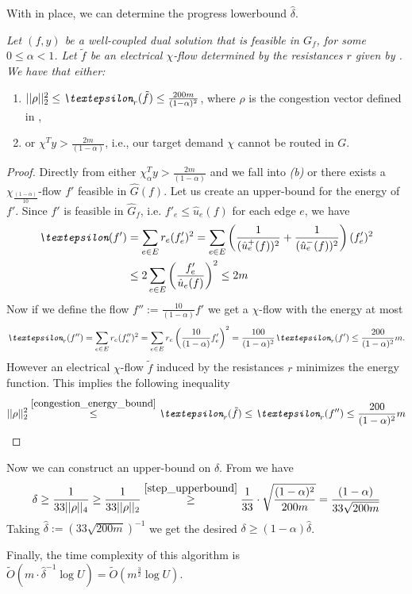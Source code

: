 With  in place, we can determine the progress lowerbound $\hat{\delta}$.
\begin{lemma}
\textit{Let $(f,y)$ be a well-coupled dual solution that is feasible in $G_f$, for some $0\le\alpha<1$. Let $\tilde  f$ be an electrical $\chi$-flow determined by the resistances $r$ given by  . We have that either:}
\begin{enumerate}[label=(\alph*)]
    \item $||\rho||_2^2\le\emph{\textepsilon}_r(\tilde  f)\le\frac{200m}{(1-\alpha)^2}$, where $\rho$ is the congestion vector defined in ,
    \item or $\chi^Ty>\frac{2m}{(1-\alpha)}$, i.e., our target demand $\chi$ cannot be routed in $G$.
\end{enumerate}
\end{lemma}
\begin{proof}
Directly from  either $\chi_\alpha^Ty>\frac{2m}{(1-\alpha)}$ and we fall into \textit{(b)} or there exists a $\chi_\frac{(1-\alpha)}{10}$-flow $f'$ feasible in $\hat G(f)$.
Let us create an upper-bound for the energy of $f'$. Since $f'$ is feasible in $\hat G_f$, i.e. $f'_e\le\hat u_e(f)$ for each edge $e$, we have
\begin{equation} 
\begin{split}
\emph{\textepsilon}(f')
&= \sum_{e\in E} r_e(f'_e)^2
= \sum_{e\in E}\left(\frac{1}{(\hat u_e^+(f))^2}+\frac{1}{(\hat u_e^-(f))^2}\right)(f'_e)^2\\
&\le 2\sum_{e\in E}\left(\frac{f'_e}{\hat u_e(f)}\right)^2
\le 2m
\end{split}
\end{equation}
Now if we define the flow $f'' := \frac{10}{(1-\alpha)}f'$ we get a $\chi$-flow with the energy at most
\[
\emph{\textepsilon}_r(f'')
= \sum_{e\in E} r_e(f''_e)^2
= \sum_{e\in E} r_e\left( \frac{10}{(1-\alpha)}f'_e\right)^2
= \frac{100}{(1-\alpha)^2} \emph{\textepsilon}_r(f')
\le \frac{200}{(1-\alpha)^2}m.
\]
However an electrical $\chi$-flow $\tilde f$ induced by the resistances $r$ minimizes the energy function. This implies the following inequality
\[
||\rho||_2^2
\stackrel{\ref{congestion_energy_bound}}{\le} \emph{\textepsilon}_r(\tilde f)
\le \emph{\textepsilon}_r(f'')
\le \frac{200}{(1-\alpha)^2}m
\]
\end{proof}

Now we can construct an upper-bound on $\delta$. From  we have
\[
\delta
\ge \frac{1}{33||\rho||_4}
\ge \frac{1}{33||\rho||_2}
\stackrel{\ref{step_upperbound}}{\ge} \frac{1}{33}\cdot\sqrt{\frac{(1-\alpha)^2}{200 m}}
= \frac{(1-\alpha)}{33\sqrt{200 m}}
\]
Taking $\hat{\delta} := (33\sqrt{200 m})^{-1}$ we get the desired $\delta \ge (1-\alpha)\hat{\delta}$.

Finally, the time complexity of this algorithm is
$\tilde  O(m\cdot\hat{\delta}^{-1}\log U) = \tilde  O(m^\frac{3}{2}\log U)$.